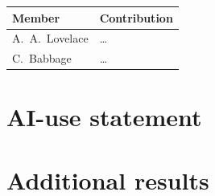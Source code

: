 \documentclass[11pt,a4paper]{article}
\newif\ifshowguide
\theoremstyle{plain}
\theoremstyle{definition}
\theoremstyle{remark}
\newcommand{\guide}[1]{\ifshowguide\par\smallskip\noindent
  \colorbox{gray!12}{\parbox{\dimexpr\linewidth-2\fboxsep}{\small\itshape
  \textbf{Guidance.} #1}}\par\smallskip\fi}
\begin{document}
\noindent
\begin{tabularx}{\linewidth}{@{}lX@{}}
  \toprule
  Member & Contribution \\
  \midrule
  A.~A.~Lovelace & \dots \\
  C.~Babbage     & \dots \\
  \bottomrule
\end{tabularx}

\section{AI-use statement}

\guide{Required. Which AI tools you used and for what: code, language
editing, finding literature. Every member must be able to explain every
equation and every line of the core code. If you used none, say so.}

\section{Additional results}

\guide{Optional. Proofs, extra figures and tables that support the main
text. Reviewers are not required to read the appendices, so everything
needed to follow the report belongs in the main body.}
\fi
\end{document}

